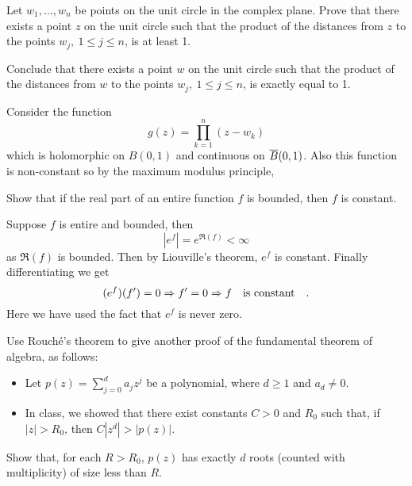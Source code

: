 \documentclass[12pt]{memoir}
\begin{document}
\begin{Ej}
    Let $w_1,\dots , w_n$ be points on the unit circle in the complex plane. Prove that there exists a point $z$ on the unit circle such that the product of the distances from $z$ to the points $w_j,\ 1\leq j\leq n$, is at least 1.\par
    Conclude that there exists a point $w$ on the unit circle such that the product of the distances from $w$ to the points $w_j,\ 1\leq j\leq n$, is exactly equal to 1.
\end{Ej}
\begin{ptcbr}
Consider the function 
$$g(z)=\prod_{k=1}^{n}(z-w_k)$$
which is holomorphic on $B(0,1)$ and continuous on $\overline B(0,1)$. Also this function is non-constant so by the maximum modulus principle, 
\end{ptcbr}

\begin{Ej}
    Show that if the real part of an entire function $f$ is bounded, then $f$ is constant. 
\end{Ej}

\begin{ptcbr}
Suppose $f$ is entire and bounded, then 
$$|e^f|=e^{\Re(f)}<\infty$$
as $\Re(f)$ is bounded. Then by Liouville's theorem, $e^f$ is constant. Finally differentiating we get 
$$(e^f)(f')=0\Rightarrow f'=0\Rightarrow f\quad\text{is constant}\quad.$$
Here we have used the fact that $e^f$ is never zero.
\end{ptcbr}

\begin{Ej}
    Use Rouché's theorem to give another proof of the fundamental theorem of algebra, as follows:
    \begin{itemize}
        \itemsep=-0.4em 
        \item Let $p(z)=\sum_{j=0}^{d} a_jz^j$ be a polynomial, where $d\geq 1$ and $a_d\neq 0$.
        \item In class, we showed that there exist constants $C > 0$ and $R_0$ such that, if $|z| > R_0$, then $C|z^d|>|p(z)|$.
    \end{itemize}
Show that, for each $R > R_0$, $p(z)$ has exactly $d$ roots (counted with multiplicity) of size less
than $R$.
\end{Ej}
\end{document}
